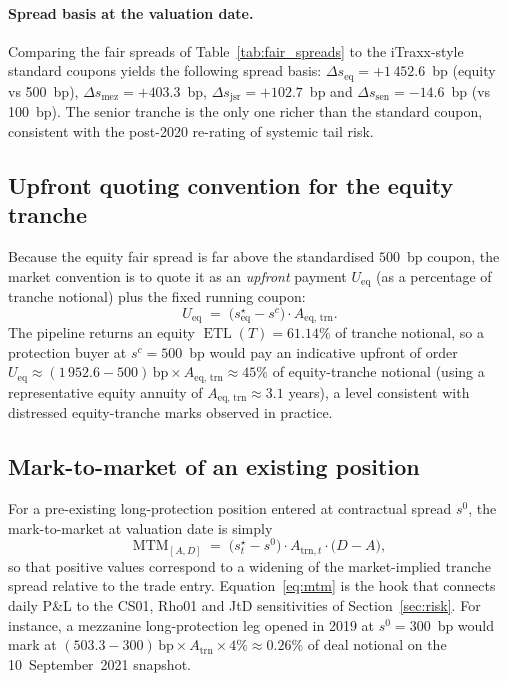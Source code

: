 \documentclass[11pt,a4paper]{article}
\newcommand{\1}{\mathbf{1}}
\DeclareMathOperator{\ETL}{ETL}
\begin{document}
\paragraph{Spread basis at the valuation date.}
Comparing the fair spreads of Table~\ref{tab:fair_spreads} to the
iTraxx-style standard coupons yields the following spread basis:
\(\Delta s_{\mathrm{eq}}= +1\,452.6\)~bp (equity vs 500~bp),
\(\Delta s_{\mathrm{mez}}= +403.3\)~bp,
\(\Delta s_{\mathrm{jsr}}= +102.7\)~bp and
\(\Delta s_{\mathrm{sen}}= -14.6\)~bp (vs 100~bp).  The senior
tranche is the only one richer than the standard coupon, consistent
with the post-2020 re-rating of systemic tail risk.

\subsection{Upfront quoting convention for the equity tranche}
Because the equity fair spread is far above the standardised
\(500\)~bp coupon, the market convention is to quote it as an
\emph{upfront} payment \(U_{\mathrm{eq}}\) (as a percentage of
tranche notional) plus the fixed running coupon:
\begin{equation}
U_{\mathrm{eq}}
\;=\;\bigl(s^{\star}_{\mathrm{eq}}-s^{c}\bigr)\cdot A_{\mathrm{eq,\,trn}}.
\label{eq:upfront_eq}
\end{equation}
The pipeline returns an equity \(\ETL(T)=61.14\%\) of tranche
notional, so a protection buyer at \(s^{c}=500\)~bp would pay an
indicative upfront of order
\(U_{\mathrm{eq}}\approx(1\,952.6-500)\,\mathrm{bp}\times A_{\mathrm{eq,\,trn}}
\approx 45\%\) of equity-tranche notional (using a representative
equity annuity of \(A_{\mathrm{eq,\,trn}}\approx 3.1\) years), a
level consistent with distressed equity-tranche marks observed in
practice.

\subsection{Mark-to-market of an existing position}\label{sec:mtm}
For a pre-existing long-protection position entered at contractual
spread \(s^{0}\), the mark-to-market at valuation date is simply
\begin{equation}
\mathrm{MTM}_{[A,D]}
\;=\; \bigl(s^{\star}_{t}-s^{0}\bigr)\cdot A_{\mathrm{trn},t}
\cdot\bigl(D-A\bigr),
\label{eq:mtm}
\end{equation}
so that positive values correspond to a widening of the
market-implied tranche spread relative to the trade entry.
Equation~\eqref{eq:mtm} is the hook that connects daily P\&L to the
CS01, Rho01 and JtD sensitivities of Section~\ref{sec:risk}.
For instance, a mezzanine long-protection leg opened in 2019 at
\(s^{0}=300\)~bp would mark at
\((503.3-300)\,\mathrm{bp}\times A_{\mathrm{trn}}\times 4\%\approx
0.26\%\) of deal notional on the 10~September~2021 snapshot.
\end{document}
